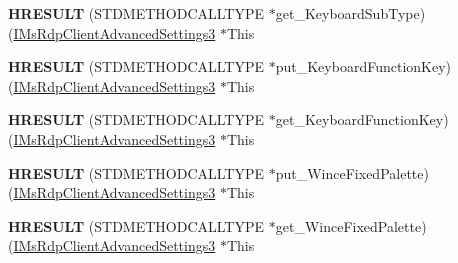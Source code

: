 \begin{DoxyCompactItemize}
\item 
\mbox{\label{struct_m_s_t_s_c_lib_1_1_i_ms_rdp_client_advanced_settings3_vtbl_a1faf04d3fcc1452f4d85910116cb50ff}} 
{\bfseries H\+R\+E\+S\+U\+LT} (S\+T\+D\+M\+E\+T\+H\+O\+D\+C\+A\+L\+L\+T\+Y\+PE $\ast$get\+\_\+\+Keyboard\+Sub\+Type)(\hyperlink{interface_m_s_t_s_c_lib_1_1_i_ms_rdp_client_advanced_settings3}{I\+Ms\+Rdp\+Client\+Advanced\+Settings3} $\ast$This
\item 
\mbox{\label{struct_m_s_t_s_c_lib_1_1_i_ms_rdp_client_advanced_settings3_vtbl_a1a0a3d77f25356c294d09bbbde23717f}} 
{\bfseries H\+R\+E\+S\+U\+LT} (S\+T\+D\+M\+E\+T\+H\+O\+D\+C\+A\+L\+L\+T\+Y\+PE $\ast$put\+\_\+\+Keyboard\+Function\+Key)(\hyperlink{interface_m_s_t_s_c_lib_1_1_i_ms_rdp_client_advanced_settings3}{I\+Ms\+Rdp\+Client\+Advanced\+Settings3} $\ast$This
\item 
\mbox{\label{struct_m_s_t_s_c_lib_1_1_i_ms_rdp_client_advanced_settings3_vtbl_ad5d02d65c92e29821979e7aed1249732}} 
{\bfseries H\+R\+E\+S\+U\+LT} (S\+T\+D\+M\+E\+T\+H\+O\+D\+C\+A\+L\+L\+T\+Y\+PE $\ast$get\+\_\+\+Keyboard\+Function\+Key)(\hyperlink{interface_m_s_t_s_c_lib_1_1_i_ms_rdp_client_advanced_settings3}{I\+Ms\+Rdp\+Client\+Advanced\+Settings3} $\ast$This
\item 
\mbox{\label{struct_m_s_t_s_c_lib_1_1_i_ms_rdp_client_advanced_settings3_vtbl_a35cd0034a83c9fcd9afa58970a17899c}} 
{\bfseries H\+R\+E\+S\+U\+LT} (S\+T\+D\+M\+E\+T\+H\+O\+D\+C\+A\+L\+L\+T\+Y\+PE $\ast$put\+\_\+\+Wince\+Fixed\+Palette)(\hyperlink{interface_m_s_t_s_c_lib_1_1_i_ms_rdp_client_advanced_settings3}{I\+Ms\+Rdp\+Client\+Advanced\+Settings3} $\ast$This
\item 
\mbox{\label{struct_m_s_t_s_c_lib_1_1_i_ms_rdp_client_advanced_settings3_vtbl_a82852e52bd658cf184ee8afd3376071c}} 
{\bfseries H\+R\+E\+S\+U\+LT} (S\+T\+D\+M\+E\+T\+H\+O\+D\+C\+A\+L\+L\+T\+Y\+PE $\ast$get\+\_\+\+Wince\+Fixed\+Palette)(\hyperlink{interface_m_s_t_s_c_lib_1_1_i_ms_rdp_client_advanced_settings3}{I\+Ms\+Rdp\+Client\+Advanced\+Settings3} $\ast$This

\end{DoxyCompactItemize}
